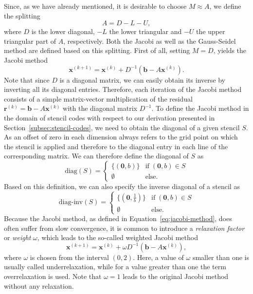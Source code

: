 Since, as we have already mentioned, it is desirable to choose $M \approx A$, we define the splitting
\begin{equation}
	A = D - L - U,
\end{equation} 
where $D$ is the lower diagonal, $-L$ the lower triangular and $-U$ the upper triangular part of $A$, respectively.
Both the Jacobi as well as the Gauss-Seidel method are defined based on this splitting.
First of all, setting $M = D$, yields the Jacobi method
\begin{equation}
	\bm{x}^{(k+1)} = \bm{x}^{(k)} + D^{-1}(\bm b - A \bm{x}^{(k)}).
	\label{eq:jacobi-method}
\end{equation}
Note that since $D$ is a diagonal matrix, we can easily obtain its inverse by inverting all its diagonal entries.
Therefore, each iteration of the Jacobi method consists of a simple matrix-vector multiplication of the residual $\bm{r}^{(k)} = \bm{b} - A \bm{x}^{(k)}$ with the diagonal matrix $D^{-1}$.
To define the Jacobi method in the domain of stencil codes with respect to our derivation presented in Section~\ref{subsec:stencil-codes}, we need to obtain the diagonal of a given stencil $S$.
As an offset of zero in each dimension always refers to the grid point on which the stencil is applied and therefore to the diagonal entry in each line of the corresponding matrix.
We can therefore define the diagonal of $S$ as
\begin{equation}
	\text{diag}(S) = \begin{cases}
		\{(\bm{0}, b) \} & \text{if} \; (\bm 0, b) \in S \\
		\emptyset & \text{else}.
	\end{cases}
	\label{eq:stencil-diag}
\end{equation}
Based on this definition, we can also specify the inverse diagonal of a stencil as
\begin{equation}
	\text{diag-inv}(S) = \begin{cases}
		\{(\bm{0}, \frac{1}{b}) \} & \text{if} \; (\bm 0, b) \in S \\
		\emptyset & \text{else}.
	\end{cases}
	\label{eq:stencil-diag-inv}
\end{equation}
Because the Jacobi method, as defined in Equation~\eqref{eq:jacobi-method}, does often suffer from slow convergence, it is common to introduce a \emph{relaxation factor} or \emph{weight} $\omega$, which leads to the so-called weighted Jacobi method
\begin{equation}
	\bm{x}^{(k+1)} = \bm{x}^{(k)} + \omega D^{-1}(\bm b - A \bm{x}^{(k)}),
	\label{eq:weighted-jacobi-method}
\end{equation}
where $\omega$ is chosen from the interval $\left(0, 2\right)$.
Here, a value of $\omega$ smaller than one is usually called underrelaxation, while for a value greater than one the term overrelaxation is used.
Note that $\omega = 1$ leads to the original Jacobi method without any relaxation.

